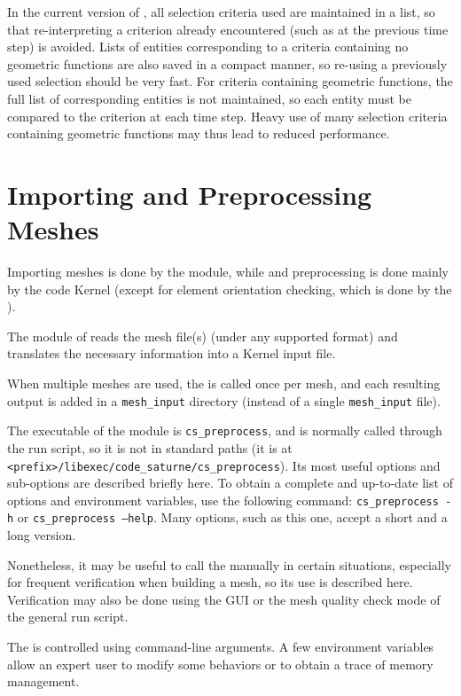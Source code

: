 {{{In the current version of \CS, all selection criteria used
are maintained in a list, so that re-interpreting a criterion already
encountered (such as at the previous time step) is avoided.
Lists of entities corresponding to a criteria containing no geometric
functions are also saved in a compact manner, so re-using a previously
used selection should be very fast. For criteria containing geometric
functions, the full list of corresponding entities is not maintained,
so each entity must be compared to the criterion at each time step.
Heavy use of many selection criteria containing geometric functions
may thus lead to reduced performance.

\section{Importing and Preprocessing Meshes}

Importing meshes is done by the \pcs module, while and preprocessing
is done mainly by the code Kernel (except for element orientation
checking, which is done by the \pcs).

The \pcs module of \CS reads the
mesh file(s) (under any supported format) and translates the necessary
information into a Kernel input file.

When multiple meshes are used, the \pcs is called once per mesh,
and each resulting output is added in a \texttt{mesh\_input}
directory (instead of a single \texttt{mesh\_input} file).

The executable of the \pcs module is \texttt{cs\_preprocess}, and
is normally called through the run script, so it is not in standard paths
(it is at \texttt{<prefix>/libexec/code\_saturne/cs\_preprocess}).
Its most useful options and sub-options are described briefly here.
To obtain a complete and up-to-date list of options and environment
variables, use the following command:
\texttt{cs\_preprocess~-h} or \texttt{cs\_preprocess~--help}.
Many options, such as this one, accept a short and a long version.

Nonetheless, it may be useful to call the \pcs manually
in certain situations, especially for frequent verification when
building a mesh, so its use is described here. Verification
may also be done using the GUI or the mesh quality check mode
of the general run script.

The \pcs is controlled using command-line arguments.
A few environment variables allow an expert user to modify
some behaviors or to obtain a trace of memory management.

}}}
